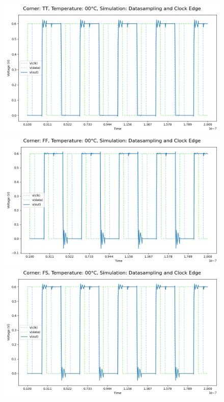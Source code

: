 \begin{figure}[H]
    \centering
    \includegraphics[height= 0.21\textheight]{figures/aimspice/TT00W1.png}
    \vspace{5pt}
    \includegraphics[height= 0.21\textheight]{figures/aimspice/FF00W1.png}
    \vspace{5pt}
    \includegraphics[height= 0.21\textheight]{figures/aimspice/FS00W1.png}

\end{figure}
